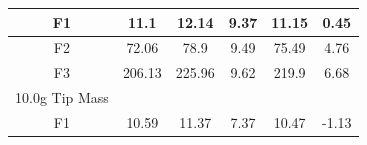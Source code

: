 \documentclass[11pt]{article}
\begin{document}
\begin{table}[H]
\begin{tabular}{|c|c|c|c|c|c|}
F1                                             & 11.1                                                                                                                     & 12.14                                                                 & \cellcolor[HTML]{FFFC9E}9.37                                                                  & 11.15                                                                    & \cellcolor[HTML]{FFFC9E}0.45                                                                  \\ \hline
F2                                             & 72.06                                                                                                                    & 78.9                                                                  & \cellcolor[HTML]{FFFC9E}9.49                                                                  & 75.49                                                                    &\cellcolor[HTML]{FFFC9E} 4.76                                                                  \\ \hline
F3                                             & 206.13                                                                                                                   & 225.96                                                                & \cellcolor[HTML]{FFFC9E}9.62                                                                  & 219.9                                                                    & \cellcolor[HTML]{FFFC9E}6.68                                                                  \\ \hline
\rowcolor[HTML]{C0C0C0} 
10.0g Tip Mass                    &                                                                                                                          &                                                                       &                                                                       &                                                                          &                                                                       \\ \hline
F1                                             & 10.59                                                                                                                    & 11.37                                                                 & \cellcolor[HTML]{FFFC9E}7.37                                                                  & 10.47                                                                    & \cellcolor[HTML]{FFFC9E}-1.13                                                                 \\ \hline

\end{tabular}
\end{table}
\end{document}

